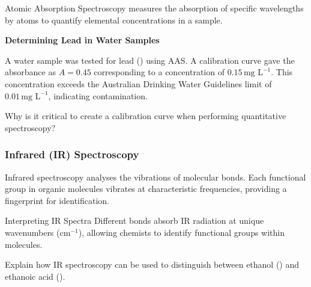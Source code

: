 Atomic Absorption Spectroscopy measures the absorption of specific wavelengths by atoms to quantify elemental concentrations in a sample. 

\begin{marginfigure}[0pt][0pt][0pt]
\caption{Key components of an Atomic Absorption Spectrometer.}
\label{fig:aas-setup}
\end{marginfigure}

\begin{example}
\textbf{Determining Lead in Water Samples}

A water sample was tested for lead () using AAS. A calibration curve gave the absorbance as $A = 0.45$ corresponding to a concentration of $0.15\,\text{mg L}^{-1}$. This concentration exceeds the Australian Drinking Water Guidelines limit of $0.01\,\text{mg L}^{-1}$, indicating contamination.
\end{example}

\begin{stopandthink}
Why is it critical to create a calibration curve when performing quantitative spectroscopy?
\end{stopandthink}

\subsubsection{Infrared (IR) Spectroscopy}

Infrared spectroscopy analyses the vibrations of molecular bonds. Each functional group in organic molecules vibrates at characteristic frequencies, providing a fingerprint for identification.

\begin{marginfigure}[0pt][0pt][0pt]
\caption{Typical IR spectrum with characteristic peaks.}
\label{fig:ir-spectrum}
\end{marginfigure}

\begin{keyconcept}{Interpreting IR Spectra}
Different bonds absorb IR radiation at unique wavenumbers (\(\text{cm}^{-1}\)), allowing chemists to identify functional groups within molecules.
\end{keyconcept}

\begin{stopandthink}
Explain how IR spectroscopy can be used to distinguish between ethanol () and ethanoic acid ().
\end{stopandthink}

